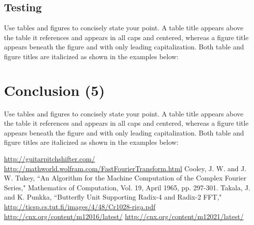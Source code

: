 \documentclass[12pt, letterpaper]{article}
\begin{document}
\subsection{Testing}
Use tables and figures to concisely state your point. A table title appears above the table it references and appears in all caps and centered, whereas a figure title appears beneath the figure and with only leading capitalization. Both table and figure titles are italicized as shown in the examples below:


\section{Conclusion (5)}
Use tables and figures to concisely state your point. A table title appears above the table it references and appears in all caps and centered, whereas a figure title appears beneath the figure and with only leading capitalization. Both table and figure titles are italicized as shown in the examples below:



\begin{thebibliography}{10}
 \url{http://guitarpitchshifter.com/}
 \url{http://mathworld.wolfram.com/FastFourierTransform.html}
 	Cooley, J. W. and J. W. Tukey, ``An Algorithm for the Machine Computation of the Complex Fourier Series," Mathematics of Computation, Vol. 19, April 1965, pp. 297-301.
 Takala, J. and K. Punkka, ``Butterfly Unit Supporting Radix-4 and Radix-2 FFT," \url{http://ticsp.cs.tut.fi/images/4/48/Cr1028-riga.pdf}
 \url{http://cnx.org/content/m12016/latest/}
 \url{http://cnx.org/content/m12021/latest/}
\end{thebibliography}
\end{document}
